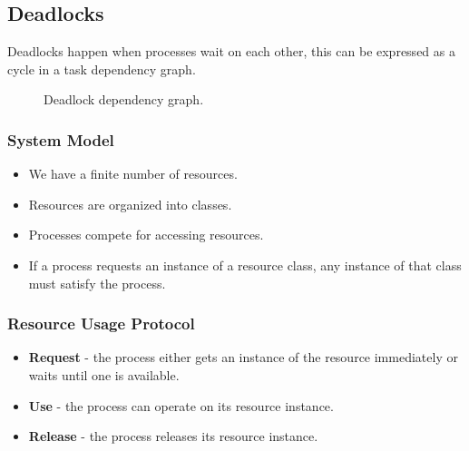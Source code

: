 \subsection{Deadlocks}

Deadlocks happen when processes wait on each other,
this can be expressed as a cycle in a task dependency graph.

\begin{figure}[h]
    \centering
    \caption{Deadlock dependency graph.}
    \label{fig:deadlock}
\end{figure}

\subsubsection{System Model}
\begin{itemize}
    \item We have a finite number of resources.
    \item Resources are organized into classes.
    \item Processes compete for accessing resources.
    \item If a process requests an instance of a resource class,
    any instance of that class must satisfy the process.
\end{itemize}

\subsubsection{Resource Usage Protocol}
\begin{itemize}
    \item \textbf{Request} - the process either gets an instance of the resource immediately or waits until one is available.
    \item \textbf{Use} - the process can operate on its resource instance.
    \item \textbf{Release} - the process releases its resource instance.
\end{itemize}

